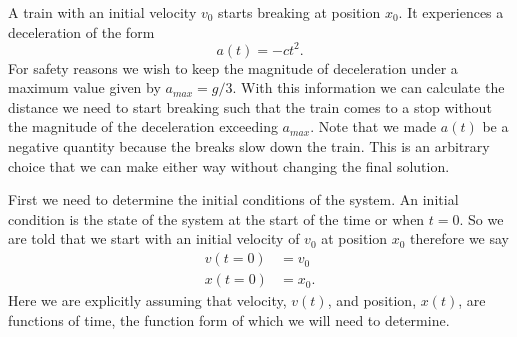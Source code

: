 \documentclass[11pt]{article}
\begin{document}
A train with an initial velocity $v_0$ starts breaking at position $x_0$. It experiences a 
deceleration of the form 
\begin{equation}
a(t) = -ct^2. 
\label{aEqn}
\end{equation}
For safety reasons we wish to keep the magnitude of deceleration under a maximum value given by $a_{max} = g/3$. With this information we can 
calculate the distance we need to start breaking such that the train comes to a stop without
the magnitude of the deceleration exceeding $a_{max}$. Note that we made $a(t)$ be a 
negative quantity because the breaks slow down the train. This is an arbitrary choice that
we can make either way without changing the final solution.

First we need to determine the initial conditions of the system. An initial condition is the
state of the system at the start of the time or when $t=0$. So we are told that we start 
with an initial velocity of $v_0$ at position $x_0$ therefore we say
\begin{align*}
v(t=0) &= v_0\\
x(t=0) &= x_0.
\end{align*}
Here we are explicitly assuming that velocity, $v(t)$, and position, $x(t)$, are functions of
time, the function form of which we will need to determine. 
\end{document}
